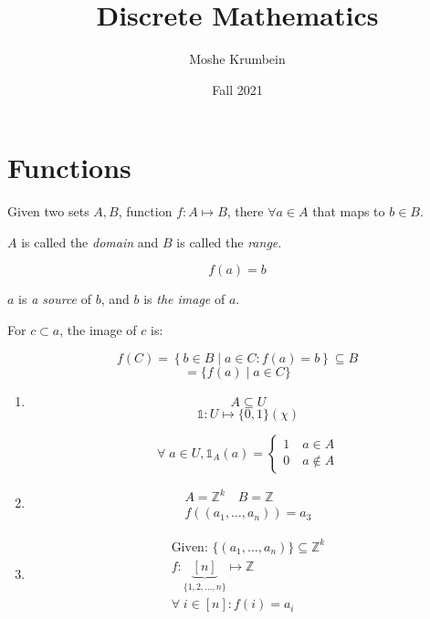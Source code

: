 \documentclass[00_complete]{subfiles}
\title{Discrete Mathematics}
\author{Moshe Krumbein}
\date{Fall 2021}
\begin{document}

\section{Functions}

Given two sets $A, B$, function $f: A \mapsto B$, there $\forall a
\in A$ that maps to $b \in B$.

$A$ is called the \emph{domain} and $B$ is called the \emph{range}.

$$f(a)=b$$

$a$ is \emph{a source} of $b$, and $b$ is \emph{the image} of $a$.

For $c \subset a$, the image of $c$ is:

$$f(C) = \left\{b \in B \mid a \in C : f(a) = b \right\} \subseteq B$$
$$=\{f(a) \mid a \in C\}$$

\begin{example}
\begin{enumerate}
Given $f: A \mapsto B$:

$$\Im f = f(A) \subseteq B$$

Given $D \subseteq B$, the source of $D$:

$$ f^{-1}(D) = \{a \in A \mid f(a) \in D\}$$

\item
$$A \subseteq U$$
$$\mathbb{1}: U \mapsto \{0,1\} (\chi)$$

$$\forall \; a \in U, \mathbb{1}_A(a) = \begin{cases}
    1 \quad a \in A \\
    0 \quad a \notin A
\end{cases}$$

\item
$$
\begin{gathered}
    A = \mathbb{Z}^k \quad B = \mathbb{Z} \\
    f((a_1, \ldots, a_n)) = a_3
\end{gathered}
$$

\item
$$
\begin{gathered}
    \text{Given: }\{(a_1, \ldots, a_n)\} \subseteq \mathbb{Z}^k \\
    f: \underbrace{[n]}_{\{1,2,\ldots,n\}} \mapsto \mathbb{Z} \\
    \forall \; i \in [n] : f(i)= a_i
\end{gathered}
$$

\end{enumerate}
\end{example}
\end{document}
